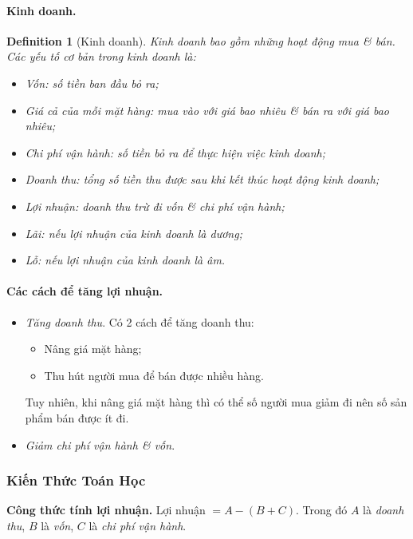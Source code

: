 \documentclass{article}
\numberwithin{equation}{section}
\newtheorem{definition}{Definition}[section]
\begin{document}
\paragraph{Kinh doanh.}
\begin{definition}[Kinh doanh]
	\emph{Kinh doanh} bao gồm những hoạt động mua \textit{\&} bán. Các yếu tố cơ bản trong kinh doanh là:
	\begin{itemize}
		\item \emph{Vốn:} số tiền ban đầu bỏ ra;
		\item \emph{Giá cả của mỗi mặt hàng:} mua vào với giá bao nhiêu \textit{\&} bán ra với giá bao nhiêu;
		\item \emph{Chi phí vận hành:} số tiền bỏ ra để thực hiện việc kinh doanh;
		\item \emph{Doanh thu:} tổng số tiền thu được sau khi kết thúc hoạt động kinh doanh;
		\item \emph{Lợi nhuận:} doanh thu trừ đi vốn \textit{\&} chi phí vận hành;
		\item \emph{Lãi:} nếu lợi nhuận của kinh doanh là dương;
		\item \emph{Lỗ:} nếu lợi nhuận của kinh doanh là âm.
	\end{itemize}
\end{definition}

\paragraph{Các cách để tăng lợi nhuận.}
\begin{itemize}
	\item \textit{Tăng doanh thu}. Có 2 cách để tăng doanh thu:
	\begin{itemize}
		\item Nâng giá mặt hàng;
		\item Thu hút người mua để bán được nhiều hàng.
	\end{itemize}
	Tuy nhiên, khi nâng giá mặt hàng thì có thể số người mua giảm đi nên số sản phẩm bán được ít đi.
	\item \textit{Giảm chi phí vận hành \textit{\&} vốn}.
\end{itemize}

\subsubsection{Kiến Thức Toán Học}

\begin{tcolorbox}
	\textbf{Công thức tính lợi nhuận.} Lợi nhuận $= A - (B + C)$. Trong đó $A$ là \textit{doanh thu}, $B$ là \textit{vốn}, $C$ là \textit{chi phí vận hành}.
\end{tcolorbox}
\end{document}
